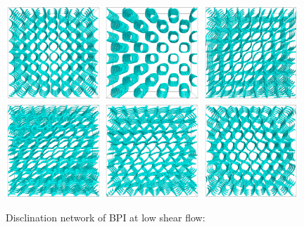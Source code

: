 \documentclass[aps,pre,onecolumn,groupedaddress]{revtex4-1}
\begin{document}
\begin{figure}[h]
\includegraphics[width=0.32\textwidth]{disc-xy-400k_run1115.png}
\includegraphics[width=0.32\textwidth]{disc-yz-400k_run1115.png}
\includegraphics[width=0.32\textwidth]{disc-xy-600k_run1115.png}\\
\includegraphics[width=0.32\textwidth]{disc-xy-725k_run1115.png}
\includegraphics[width=0.32\textwidth]{disc-xy-750k_run1115.png}
\includegraphics[width=0.32\textwidth]{disc-xy-775k_run1115.png}
\caption{Disclination network of BPI at low shear flow:}
\label{bp1-low}
\end{figure}
\end{document}
